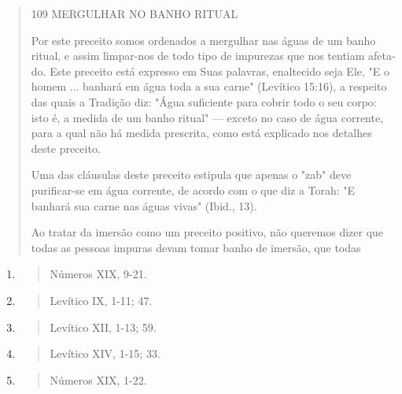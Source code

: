 \begin{quote}
109 MERGULHAR NO BANHO RITUAL

Por este preceito somos ordenados a mergulhar nas águas de um ba­nho
ritual, e assim limpar-nos de todo tipo de impurezas que nos tentiam
afeta­do. Este preceito está expresso em Suas palavras, enaltecido seja
Ele, "E o ho­mem ... banhará em água toda a sua carne" (Levítico 15:16),
a respeito das quais a Tradição diz: "Água suficiente para cobrir todo o
seu corpo: isto é, a medida de um banho ritual" --- exceto no caso de
água corrente, para a qual não há medida prescrita, como está explicado
nos detalhes deste preceito.

Uma das cláusulas deste preceito estipula que apenas o "zab" deve
purificar-se em água corrente, de acordo com o que diz a Torah: "E
banhará sua carne nas águas vivas" (Ibid., 13).

Ao tratar da imersão como um preceito positivo, não queremos di­zer que
todas as pessoas impuras devam tomar banho de imersão, que todas
\end{quote}

\begin{enumerate}
\def\labelenumi{\arabic{enumi}.}
\setcounter{enumi}{145}
\item
  \begin{quote}
  Números XIX, 9-21.
  \end{quote}
\item
  \begin{quote}
  Levítico IX, 1-11; 47.
  \end{quote}
\item
  \begin{quote}
  Levítico XII, 1-13; 59.
  \end{quote}
\item
  \begin{quote}
  Levítico XIV, 1-15; 33.
  \end{quote}
\item
  \begin{quote}
  Números XIX, 1-22.
  \end{quote}
\end{enumerate}

